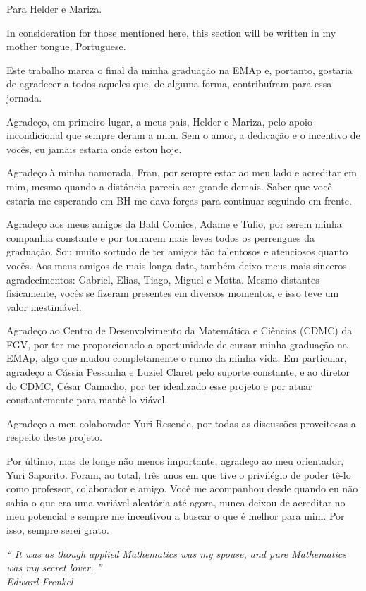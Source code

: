 \newpage

\begin{dedicatoria}
    \vspace*{\fill}
    \hfill
    \begin{minipage}{.6\textwidth}
        Para Helder e Mariza.
    \end{minipage}
\end{dedicatoria}
 
\begin{agradecimentos}
    In consideration for those mentioned here, this section will be written in my mother tongue, Portuguese.

    Este trabalho marca o final da minha graduação na EMAp e, portanto, gostaria de agradecer a todos aqueles que, de alguma forma, contribuíram para essa jornada.

    Agradeço, em primeiro lugar, a meus pais, Helder e Mariza, pelo apoio incondicional que sempre deram a mim.
    Sem o amor, a dedicação e o incentivo de vocês, eu jamais estaria onde estou hoje.
    
    Agradeço à minha namorada, Fran, por sempre estar ao meu lado e acreditar em mim, mesmo quando a distância parecia ser grande demais.
    Saber que você estaria me esperando em BH me dava forças para continuar seguindo em frente.

    Agradeço aos meus amigos da Bald Comics, Adame e Tulio, por serem minha companhia constante e por tornarem mais leves todos os perrengues da graduação.
    Sou muito sortudo de ter amigos tão talentosos e atenciosos quanto vocês.
    Aos meus amigos de mais longa data, também deixo meus mais sinceros agradecimentos: Gabriel, Elias, Tiago, Miguel e Motta.
    Mesmo distantes fisicamente, vocês se fizeram presentes em diversos momentos, e isso teve um valor inestimável.

    Agradeço ao Centro de Desenvolvimento da Matemática e Ciências (CDMC) da FGV, por ter me proporcionado a oportunidade de cursar minha graduação na EMAp, algo que mudou completamente o rumo da minha vida.
    Em particular, agradeço a Cássia Pessanha e Luziel Claret pelo suporte constante, e ao diretor do CDMC, César Camacho, por ter idealizado esse projeto e por atuar constantemente para mantê-lo viável.

    Agradeço a meu colaborador Yuri Resende, por todas as discussões proveitosas a respeito deste projeto.

    Por último, mas de longe não menos importante, agradeço ao meu orientador, Yuri Saporito.
    Foram, ao total, três anos em que tive o privilégio de poder tê-lo como professor, colaborador e amigo.
    Você me acompanhou desde quando eu não sabia o que era uma variável aleatória até agora, nunca deixou de acreditar no meu potencial e sempre me incentivou a buscar o que é melhor para mim.
    Por isso, sempre serei grato.
\end{agradecimentos}

\begin{epigrafe}
\vspace*{\fill}

\begin{flushright}
    \hspace{7.5cm}
    \textit{
        ``
        It was as though applied Mathematics was my spouse, and pure Mathematics was my secret lover.
        ''
    } \\
        \textit{Edward Frenkel}
\end{flushright}
\end{epigrafe}
